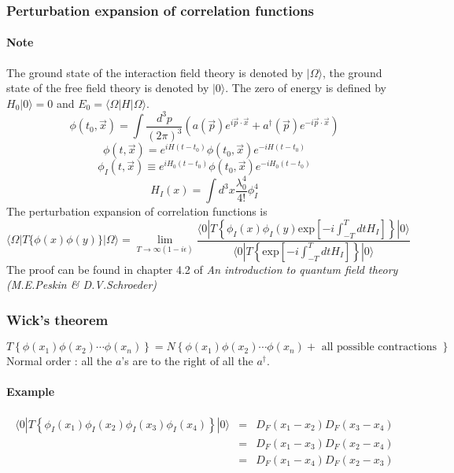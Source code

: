 \documentclass{article}
\begin{document}
\subsubsection{Perturbation expansion of correlation functions}
\paragraph{Note} The ground state of the interaction field theory is denoted by $| \Omega \rangle$, the ground state of the free field theory is denoted by $| 0 \rangle$. The zero of energy is defined by $H_0 | 0 \rangle =0$ and $E_0 = \langle \Omega | H | \Omega \rangle$.\\
\[\phi(t_0,\vec{x}) = \int \frac{d^3p}{(2\pi)^3}( a(\vec{p})e^{i\vec{p}\cdot\vec{x}} + a^{\dagger}(\vec{p})e^{-i\vec{p}\cdot\vec{x}})\]
\[\phi(t,\vec{x}) = e^{iH(t-t_0)} \phi(t_0,\vec{x}) e^{-iH(t-t_0)}\]
\[\phi_I(t,\vec{x}) \equiv e^{iH_0(t-t_0)} \phi(t_0,\vec{x}) e^{-iH_0(t-t_0)}\]
\[H_I(x) = \int d^3x \frac{\lambda_0^4}{4!} \phi_I^4\]
The perturbation expansion of correlation functions is
\[\langle \Omega | T \{ \phi(x) \phi(y) \} | \Omega \rangle = \lim_{T \to \infty(1-i\epsilon)} \frac{\langle 0 | T \left\{ \phi_I(x) \phi_I(y) \mathrm{exp} \left[ -i \int_{-T}^{T} dt H_I \right]\right\} | 0 \rangle}{\langle 0 | T \left\{ \mathrm{exp} \left[ -i \int_{-T}^{T} dt H_I \right]\right\} | 0 \rangle}\]
The proof can be found in chapter 4.2 of \emph{An introduction to quantum field theory (M.E.Peskin \& D.V.Schroeder)}

\subsubsection{Wick's theorem}
\[T \left\{ \phi(x_1) \phi(x_2) \cdots \phi(x_n)\right\} = N \left\{ \phi(x_1) \phi(x_2) \cdots \phi(x_n) + \mbox{ all possible contractions }\right\} \]
Normal order : all the $a$'s are to the right of all the $a^{\dagger}$.
\paragraph{Example} 
\begin{eqnarray}
\langle 0 | T \left\{ \phi_I(x_1) \phi_I(x_2) \phi_I(x_3) \phi_I(x_4)\right\}| 0 \rangle &=& D_F(x_1-x_2)D_F(x_3-x_4) \nonumber \\
&=& D_F(x_1-x_3)D_F(x_2-x_4) \nonumber \\
&=& D_F(x_1-x_4)D_F(x_2-x_3) \nonumber
\end{eqnarray}
\end{document}
